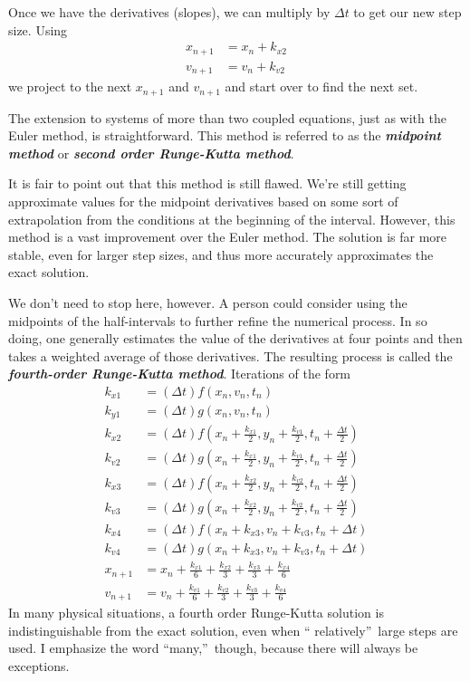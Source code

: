 \documentclass[twoside,11pt,ShortChapTitles]{BYUTextbook}
\begin{document}
Once we have the derivatives (slopes), we can multiply by $\Delta t$ to get
our new step size. Using
\begin{align*}
x_{n+1}  & =x_{n}+k_{x2}\\
v_{n+1}  & =v_{n}+k_{v2} \end{align*}
we project to the next $x_{n+1}$ and $v_{n+1}$ and start over to find the next set.

The extension to systems of more than two coupled equations, just as with the
Euler method, is straightforward. This method is referred to as the
\emph{\textbf{midpoint method}} or \emph{\textbf{second order Runge-Kutta
method}}.

It is fair to point out that this method is still flawed. We're still getting
approximate values for the midpoint derivatives based on some sort of
extrapolation from the conditions at the beginning of the interval. However,
this method is a vast improvement over the Euler method. The solution is far
more stable, even for larger step sizes, and thus more accurately approximates
the exact solution.

We don't need to stop here, however. A person could consider using the
midpoints of the half-intervals to further refine the numerical process. In so
doing, one generally estimates the value of the derivatives at four points and
then takes a weighted average of those derivatives. The resulting process is
called the \emph{\textbf{fourth-order Runge-Kutta method}}. Iterations of the
form
\begin{align*}
k_{x1}  & =(\Delta t)f(x_{n},v_{n},t_{n})\\
k_{y1}  & =(\Delta t)g(x_{n},v_{n},t_{n})\\
k_{x2}  & =(\Delta t)f\left(  x_{n}+\frac{k_{x1}}{2},y_{n}+\frac{k_{v1}} {2},t_{n}+\frac{\Delta t}{2}\right) \\
k_{v2}  & =(\Delta t)g\left(  x_{n}+\frac{k_{x1}}{2},y_{n}+\frac{k_{v1}} {2},t_{n}+\frac{\Delta t}{2}\right) \\
k_{x3}  & =(\Delta t)f\left(  x_{n}+\frac{k_{x2}}{2},y_{n}+\frac{k_{v2}} {2},t_{n}+\frac{\Delta t}{2}\right) \\
k_{v3}  & =(\Delta t)g\left(  x_{n}+\frac{k_{x2}}{2},y_{n}+\frac{k_{v2}} {2},t_{n}+\frac{\Delta t}{2}\right) \\
k_{x4}  & =(\Delta t)f(x_{n}+k_{x3},v_{n}+k_{v3},t_{n}+\Delta t)\\
k_{v4}  & =(\Delta t)g(x_{n}+k_{x3},v_{n}+k_{v3},t_{n}+\Delta t)\\
x_{n+1}  & =x_{n}+\frac{k_{x1}}{6}+\frac{k_{x2}}{3}+\frac{k_{x3}}{3} +\frac{k_{x4}}{6}\\
v_{n+1}  & =v_{n}+\frac{k_{v1}}{6}+\frac{k_{v2}}{3}+\frac{k_{v3}}{3} +\frac{k_{v4}}{6} 
\end{align*}
In many physical situations, a fourth order Runge-Kutta solution is
indistinguishable from the exact solution, even when \textquotedblleft
relatively\textquotedblright\ large steps are used. I emphasize the word
\textquotedblleft many,\textquotedblright\ though, because there will always
be exceptions.
\end{document}
